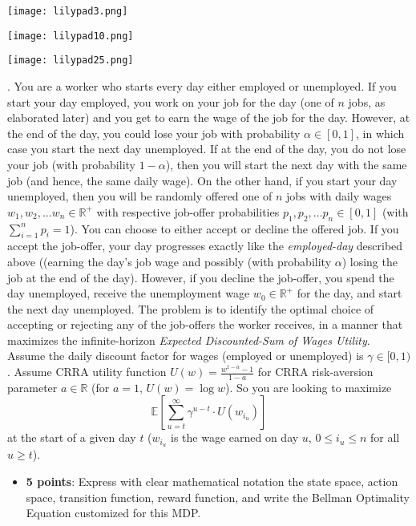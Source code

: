 \documentclass[12pt]{exam}
\begin{document}
\begin{questions}
\begin{itemize}
\texttt{[image: lilypad3.png]}

\texttt{[image: lilypad10.png]}

\texttt{[image: lilypad25.png]}


\end{itemize}

\vspace{3mm}
. You are a worker who starts every day either employed or unemployed. If you start your day employed, you work on your job for the day (one of $n$ jobs, as elaborated later) and you get to earn the wage of the job for the day. However, at the end of the day, you could lose your job with probability $\alpha \in [0,1]$, in which case you start the next day unemployed. If at the end of the day, you do not lose your job (with probability $1-\alpha$), then you will start the next day with the same job (and hence, the same daily wage). On the other hand, if you start your day unemployed, then you will be randomly offered one of $n$ jobs with daily wages $w_1, w_2, \ldots w_n \in \mathbb{R}^+$ with respective job-offer probabilities $p_1, p_2, \ldots p_n \in [0,1]$ (with $\sum_{i=1}^n p_i = 1$). You can choose to either accept or decline the offered job. If you accept the job-offer, your day progresses exactly like the {\em employed-day} described above ((earning the day's job wage and possibly (with probability $\alpha$) losing the job at the end of the day). However, if you decline the job-offer, you spend the day unemployed, receive the unemployment wage $w_0 \in \mathbb{R}^+$ for the day, and start the next day unemployed. The problem is to identify the optimal choice of accepting or rejecting any of the job-offers the worker receives, in a manner that maximizes the infinite-horizon {\em Expected Discounted-Sum of Wages Utility}. Assume the daily discount factor for wages (employed or unemployed) is $\gamma \in [0,1)$. Assume CRRA utility function $U(w) = \frac {w^{1-a} - 1} {1-a}$ for CRRA risk-aversion parameter $a \in \mathbb{R}$ (for $a=1$, $U(w) = \log w$). So you are looking to maximize
$$\mathbb{E}[\sum_{u=t}^\infty \gamma^{u-t} \cdot U(w_{i_u})]$$
 at the start of a given day $t$ ($w_{i_u}$ is the wage earned on day $u$, $0\leq i_u \leq n$ for all $u\geq t$).

\begin{itemize}
\item {\bf 5 points}: Express with clear mathematical notation the state space, action space, transition function, reward function, and write the Bellman Optimality Equation customized for this MDP.


\end{itemize}
\end{questions}
\end{document}
